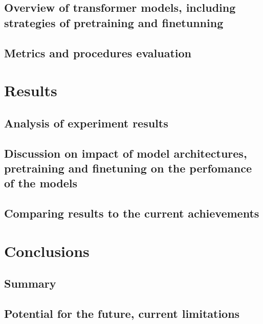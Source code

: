 \documentclass[a4paper,12pt]{report}
\begin{document}
\section{Overview of transformer models, including strategies of pretraining and finetunning}
\section{Metrics and procedures evaluation}


\chapter{Results}\label{cap:results}
\section{Analysis of experiment results}
\section{Discussion on impact of model architectures, pretraining and finetuning on the perfomance of the models}
\section{Comparing results to the current achievements}


\chapter{Conclusions}\label{cap:conclusions}
\section{Summary}
\section{Potential for the future, current limitations}



    
    
\end{document}
